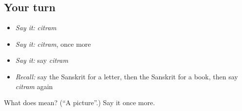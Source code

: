 \subsection*{Your turn}
\begin{itemize}
\raggedright
  \item \emph{Say it:} \emph{citram}
  \item \emph{Say it:} \emph{citram}, once more
  \item \emph{Say it:} say \emph{citram}
  \item \emph{Recall:} say the Sanskrit for a letter, then the Sanskrit for a book, then say \emph{citram} again
\end{itemize}

\begin{tcolorbox}[breakable,colback=teal!4,colframe=teal!35!black,title={Before you move on}]
What does  mean? (\textquotedblleft{}A picture\textquotedblright{}.) Say it once more.
\end{tcolorbox}
